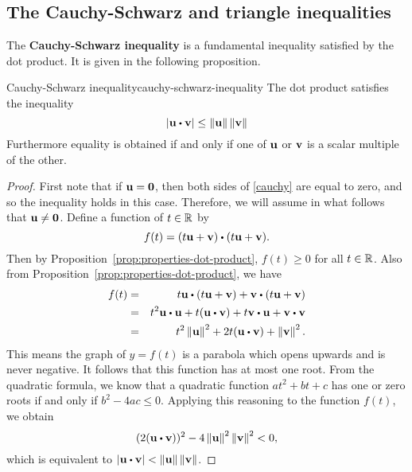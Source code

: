 \subsection{The Cauchy-Schwarz and triangle inequalities}

The \textbf{Cauchy-Schwarz inequality}%
 is a fundamental
inequality satisfied by the dot product.  It is given in the following
proposition.

\begin{proposition}{Cauchy-Schwarz inequality}{cauchy-schwarz-inequality}
  The dot product satisfies the inequality
  \begin{equation}\label{cauchy}
    \abs{\vect{u}\dotprod \vect{v}}\leq \norm{\vect{u}} \norm{\vect{v}}
  \end{equation}
  Furthermore equality is obtained if and only if one of $\vect{u}$ or $\vect{v}$ is a scalar multiple of the other.
\end{proposition}

\begin{proof}
  First note that if $\vect{u}=\vect{0}$, then both sides of
  \eqref{cauchy} are equal to zero, and so the inequality holds in
  this case. Therefore, we will assume in what follows that
  $\vect{u}\neq \vect{0}$.  Define a function of $t\in \mathbb{R}$ by
  \begin{equation*}
    f(t) =(t\vect{u}+\vect{v}) \dotprod (t\vect{u}+\vect{v}).
  \end{equation*}
  Then by Proposition~\ref{prop:properties-dot-product}, $f(t) \geq 0$
  for all $t\in \mathbb{R}$.  Also from
  Proposition~\ref{prop:properties-dot-product}, we have
  \begin{eqnarray*}
    f(t)
    &=& t\vect{u}\dotprod (t\vect{u}+\vect{v})
        + \vect{v}\dotprod (t\vect{u}+\vect{v}) \\
    &=& t^2\vect{u}\dotprod \vect{u}+t(\vect{u}\dotprod \vect{v})
        + t \vect{v}\dotprod \vect{u}
        + \vect{v}\dotprod \vect{v} \\
    &=& t^2\norm{\vect{u}}^2
        + 2t(\vect{u}\dotprod \vect{v})
        + \norm{\vect{v}}^2.
  \end{eqnarray*}
  This means the graph of $y=f(t)$ is a parabola which opens upwards
  and is never negative. It follows that this function has at most one
  root. From the quadratic formula, we know that a quadratic function
  $at^2+bt+c$ has one or zero roots if and only if $b^2-4ac\leq
  0$. Applying this reasoning to the function $f(t)$, we obtain
  \begin{equation*}
    (2(\vect{u}\dotprod \vect{v}))^2-4\norm{\vect{u}}^2\norm{\vect{v}}^2<0,
  \end{equation*}
  which is equivalent to
  $\abs{\vect{u}\dotprod \vect{v}}<\norm{\vect{u}} \norm{\vect{v}}$.
\end{proof}

